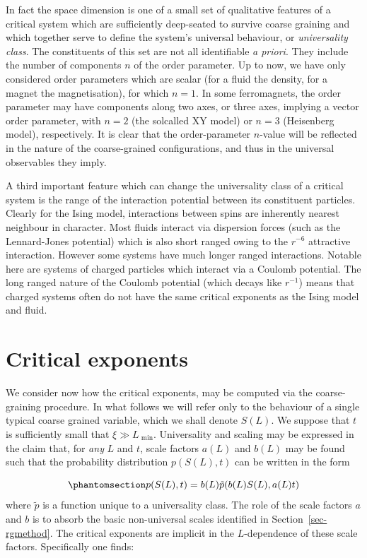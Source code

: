 \documentclass[
  letterpaper,
  enabledeprecatedfontcommands]{report}
\begin{document}
In fact the space dimension is one of a small set of qualitative
features of a critical system which are sufficiently deep-seated to
survive coarse graining and which together serve to define the system's
universal behaviour, or \emph{universality class}. The constituents of
this set are not all identifiable \emph{a priori}. They include the
number of components \(n\) of the order parameter. Up to now, we have
only considered order parameters which are scalar (for a fluid the
density, for a magnet the magnetisation), for which \(n=1\). In some
ferromagnets, the order parameter may have components along two axes, or
three axes, implying a vector order parameter, with \(n=2\) (the
solcalled XY model) or \(n=3\) (Heisenberg model), respectively. It is
clear that the order-parameter \(n\)-value will be reflected in the
nature of the coarse-grained configurations, and thus in the universal
observables they imply.

A third important feature which can change the universality class of a
critical system is the range of the interaction potential between its
constituent particles. Clearly for the Ising model, interactions between
spins are inherently nearest neighbour in character. Most fluids
interact via dispersion forces (such as the Lennard-Jones potential)
which is also short ranged owing to the \(r^{-6}\) attractive
interaction. However some systems have much longer ranged interactions.
Notable here are systems of charged particles which interact via a
Coulomb potential. The long ranged nature of the Coulomb potential
(which decays like \(r^{-1}\)) means that charged systems often do not
have the same critical exponents as the Ising model and fluid.

\section{Critical exponents}\label{critical-exponents}

We consider now how the critical exponents, may be computed via the
coarse-graining procedure. In what follows we will refer only to the
behaviour of a single typical coarse grained variable, which we shall
denote \(S(L)\). We suppose that \(t\) is sufficiently small that
\(\xi \gg
L_\textrm{ min}\). Universality and scaling may be expressed in the
claim that, for \emph{any} \(L\) and \(t\), scale factors \(a(L)\) and
\(b(L)\) may be found such that the probability distribution
\(p(S(L),t)\) can be written in the form

\begin{equation}\phantomsection\label{eq-blocks}{
p(S(L),t)=b(L)\tilde{p}(b(L)S(L),a(L)t)
}\end{equation} where \(\tilde{p}\) is a function unique to a
universality class. The role of the scale factors \(a\) and \(b\) is to
absorb the basic non-universal scales identified in
Section~\ref{sec-rgmethod}. The critical exponents are implicit in the
\(L\)-dependence of these scale factors. Specifically one finds:
\end{document}
